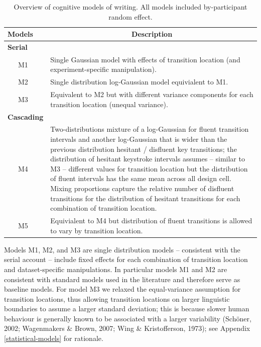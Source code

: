 \documentclass[
  man,floatsintext]{apa7}
\begin{document}
\begin{table}[tbp]

\begin{center}
\begin{threeparttable}

\caption{\label{tab:models}Overview of cognitive models of writing. All models included by-participant random effect.}

\begin{tabular}{lp{13cm}}
\toprule
Models & \multicolumn{1}{c}{Description}\\
\midrule
\textbf{Serial} & \\
\ \ \ M1 & Single Gaussian model with effects of transition location (and experiment-specific manipulation).\\
\ \ \ M2 & Single distribution log-Gaussian model equivialent to M1.\\
\ \ \ M3 & Equivalent to M2 but with different variance components for each transition location (unequal variance).\\
\textbf{Cascading} & \\
\ \ \ M4 & Two-distributions mixture of a log-Gaussian for fluent transition intervals and another log-Gaussian that is wider than the previous distribution hesitant / disfluent key transitions; the distribution of hesitant keystroke intervals assumes -- similar to M3 -- different values for transition location but the distribution of fluent intervals has the same mean across all design cell. Mixing proportions capture the relative number of disfluent transitions for the distribution of hesitant transitions for each combination of transition location.\\
\ \ \ M5 & Equivialent to M4 but distribution of fluent transitions is allowed to vary by transition location.\\
\bottomrule
\end{tabular}

\end{threeparttable}
\end{center}

\end{table}

Models M1, M2, and M3 are single distribution models -- consistent with the serial account -- include fixed effects for each combination of transition location and dataset-specific manipulations. In particular models M1 and M2 are consistent with standard models used in the literature and therefore serve as baseline models. For model M3 we relaxed the equal-variance assumption for transition locations, thus allowing transition locations on larger linguistic boundaries to assume a larger standard deviation; this is because slower human behaviour is generally known to be associated with a larger variability (Schöner, 2002; Wagenmakers \& Brown, 2007; Wing \& Kristofferson, 1973); see Appendix \ref{statistical-models} for rationale.
\end{document}
